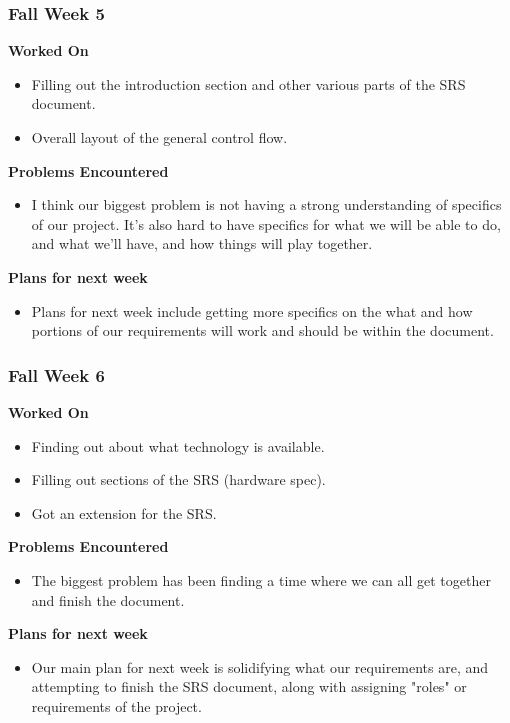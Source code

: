 \documentclass[compsoc,draftclsnofoot,onecolumn,10pt]{IEEEtran}
\begin{document}
\subsubsection*{Fall Week 5}
\textbf{Worked On}
\begin{itemize}
    \item Filling out the introduction section and other various parts of the SRS document.
    \item Overall layout of the general control flow.
\end{itemize}
\textbf{Problems Encountered}
\begin{itemize}
    \item I think our biggest problem is not having a strong understanding of specifics of our project. It's also hard to have specifics for what we will be able to do, and what we'll have, and how things will play together.
\end{itemize}
\textbf{Plans for next week}
\begin{itemize}
    \item Plans for next week include getting more specifics on the what and how portions of our requirements will work and should be within the document.
\end{itemize}


\subsubsection*{Fall Week 6}
\textbf{Worked On}
\begin{itemize}
    \item Finding out about what technology is available.
    \item Filling out sections of the SRS (hardware spec).
    \item Got an extension for the SRS.
\end{itemize}
\textbf{Problems Encountered}
\begin{itemize}
    \item The biggest problem has been finding a time where we can all get together and finish the document.
\end{itemize}
\textbf{Plans for next week}
\begin{itemize}
    \item Our main plan for next week is solidifying what our requirements are, and attempting to finish the SRS document, along with assigning "roles" or requirements of the project.
\end{itemize}
\end{document}
